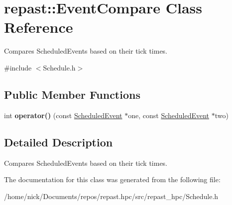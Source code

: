 \hypertarget{classrepast_1_1_event_compare}{\section{repast\-:\-:Event\-Compare Class Reference}
\label{classrepast_1_1_event_compare}
}


Compares Scheduled\-Events based on their tick times.  




{\ttfamily \#include $<$Schedule.\-h$>$}

\subsection*{Public Member Functions}
\begin{DoxyCompactItemize}
\item 
\hypertarget{classrepast_1_1_event_compare_ad7f3fe5b37b2c795f48efc46772ecd4a}{int {\bfseries operator()} (const \hyperlink{classrepast_1_1_scheduled_event}{Scheduled\-Event} $\ast$one, const \hyperlink{classrepast_1_1_scheduled_event}{Scheduled\-Event} $\ast$two)}\label{classrepast_1_1_event_compare_ad7f3fe5b37b2c795f48efc46772ecd4a}

\end{DoxyCompactItemize}


\subsection{Detailed Description}
Compares Scheduled\-Events based on their tick times. 

The documentation for this class was generated from the following file\-:\begin{DoxyCompactItemize}
\item 
/home/nick/\-Documents/repos/repast.\-hpc/src/repast\-\_\-hpc/Schedule.\-h\end{DoxyCompactItemize}
